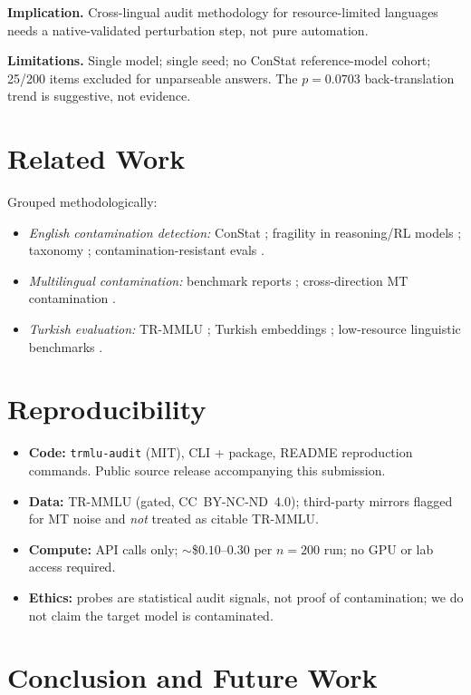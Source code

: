 \documentclass[11pt]{article}
\begin{document}
\textbf{Implication.} Cross-lingual audit methodology for resource-limited languages needs a native-validated perturbation step, not pure automation.

\textbf{Limitations.} Single model; single seed; no ConStat reference-model cohort; 25/200 items excluded for unparseable answers. The $p{=}0.0703$ back-translation trend is suggestive, not evidence.

\section{Related Work}

Grouped methodologically:
\begin{itemize}
\item \emph{English contamination detection:} ConStat \cite{constat2024}; fragility in reasoning/RL models \cite{fragile2025reasoning}; taxonomy \cite{taxonomy2024}; contamination-resistant evals \cite{beyondbench2025}.
\item \emph{Multilingual contamination:} benchmark reports \cite{contammulti2024}; cross-direction MT contamination \cite{flores2026}.
\item \emph{Turkish evaluation:} TR-MMLU \cite{trmmu2024}; Turkish embeddings \cite{turkembed2025}; low-resource linguistic benchmarks \cite{lingoly2024}.
\end{itemize}

\section{Reproducibility}

\begin{itemize}
\item \textbf{Code:} \texttt{trmlu-audit} (MIT), CLI + package, README reproduction commands. Public source release accompanying this submission.
\item \textbf{Data:} TR-MMLU (gated, CC~BY-NC-ND~4.0); third-party mirrors flagged for MT noise and \emph{not} treated as citable TR-MMLU.
\item \textbf{Compute:} API calls only; $\sim$\$$0.10$--$0.30$ per $n{=}200$ run; no GPU or lab access required.
\item \textbf{Ethics:} probes are statistical audit signals, not proof of contamination; we do not claim the target model is contaminated.
\end{itemize}

\section{Conclusion and Future Work}
\end{document}
